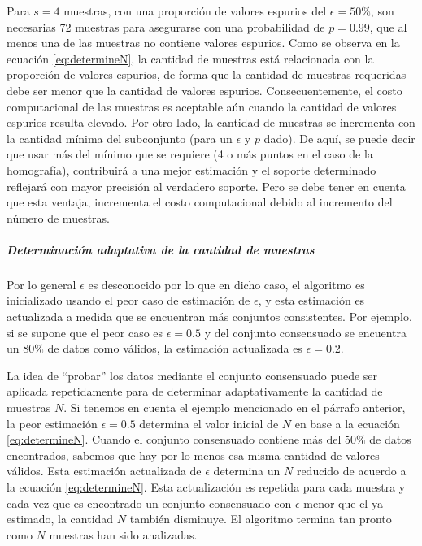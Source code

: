 \begin{itemize}
Para $s=4$ muestras, con una proporción de valores espurios del $\epsilon=50\%$, son necesarias 72 muestras para asegurarse con una probabilidad de $p=0.99$, que al menos una de las muestras no contiene valores espurios. Como se observa en la ecuación \eqref{eq:determineN}, la cantidad de muestras está relacionada con la proporción de valores espurios, de forma que la cantidad de muestras requeridas debe ser menor que la cantidad de valores espurios. Consecuentemente, el costo computacional de las muestras es aceptable aún cuando la cantidad de valores espurios resulta elevado. Por otro lado, la cantidad de muestras se incrementa con la cantidad mínima del subconjunto (para un $\epsilon$ y $p$ dado). De aquí, se puede decir que usar más del mínimo que se requiere (4 o más puntos en el caso de la homografía), contribuirá a una mejor estimación y el soporte determinado reflejará con mayor precisión al verdadero soporte. Pero se debe tener en cuenta que esta ventaja, incrementa el costo computacional debido al incremento del número de muestras.
\end{itemize}
\subparagraph{Determinación adaptativa de la cantidad de muestras}
Por lo general $\epsilon$ es desconocido por lo que en dicho caso, el algoritmo es inicializado usando el peor caso de estimación de $\epsilon$, y esta estimación es actualizada a medida que se encuentran más conjuntos consistentes. Por ejemplo, si se supone que el peor caso es $\epsilon=0.5$ y del conjunto consensuado se encuentra un $80\%$ de datos como válidos, la estimación actualizada es $\epsilon=0.2$.

La idea de ``probar'' los datos mediante el conjunto consensuado puede ser aplicada repetidamente para de determinar adaptativamente la cantidad de muestras $N$. Si tenemos en cuenta el ejemplo mencionado en el párrafo anterior, la peor estimación $\epsilon=0.5$ determina el valor inicial de $N$ en base a la ecuación \eqref{eq:determineN}. Cuando el conjunto consensuado contiene más del $50\%$ de datos encontrados, sabemos que hay por lo menos esa misma cantidad de valores válidos. Esta estimación actualizada de $\epsilon$ determina un $N$ reducido de acuerdo a la ecuación \eqref{eq:determineN}. Esta actualización es repetida para cada muestra y cada vez que es encontrado un conjunto consensuado con $\epsilon$ menor que el ya estimado, la cantidad $N$ también disminuye. El algoritmo termina tan pronto como $N$ muestras han sido analizadas.


